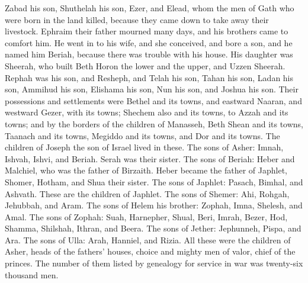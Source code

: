 {Zabad his son, Shuthelah his son, Ezer, and Elead, whom the men of Gath who were born in the land killed, because they came down to take away their livestock.
Ephraim their father mourned many days, and his brothers came to comfort him.
He went in to his wife, and she conceived, and bore a son, and he named him Beriah, because there was trouble with his house.
His daughter was Sheerah, who built Beth Horon the lower and the upper, and Uzzen Sheerah.
Rephah was his son, and Resheph, and Telah his son, Tahan his son,
Ladan his son, Ammihud his son, Elishama his son,
Nun his son, and Joshua his son.
Their possessions and settlements were Bethel and its towns, and eastward Naaran, and westward Gezer, with its towns; Shechem also and its towns, to Azzah and its towns;
and by the borders of the children of Manasseh, Beth Shean and its towns, Taanach and its towns, Megiddo and its towns, and Dor and its towns. The children of Joseph the son of Israel lived in these.
The sons of Asher: Imnah, Ishvah, Ishvi, and Beriah. Serah was their sister.
The sons of Beriah: Heber and Malchiel, who was the father of Birzaith.
Heber became the father of Japhlet, Shomer, Hotham, and Shua their sister.
The sons of Japhlet: Pasach, Bimhal, and Ashvath. These are the children of Japhlet.
The sons of Shemer: Ahi, Rohgah, Jehubbah, and Aram.
The sons of Helem his brother: Zophah, Imna, Shelesh, and Amal.
The sons of Zophah: Suah, Harnepher, Shual, Beri, Imrah,
Bezer, Hod, Shamma, Shilshah, Ithran, and Beera.
The sons of Jether: Jephunneh, Pispa, and Ara.
The sons of Ulla: Arah, Hanniel, and Rizia.
All these were the children of Asher, heads of the fathers’ houses, choice and mighty men of valor, chief of the princes. The number of them listed by genealogy for service in war was twenty-six thousand men.

}
